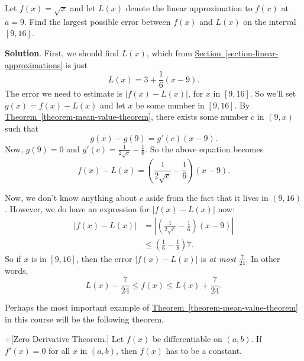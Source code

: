 \documentclass[10pt,]{book}
\theoremstyle{ptxplainnotitle}
\theoremstyle{ptxplaintitle}
\theoremstyle{ptxplainnotitle}
\theoremstyle{ptxplaintitle}
\theoremstyle{ptxplainnotitle}
\theoremstyle{ptxplaintitle}
\theoremstyle{ptxdefinitionnotitle}
\theoremstyle{ptxdefinitiontitle}
\theoremstyle{ptxdefinitionnotitle}
\theoremstyle{ptxdefinitiontitle}
\theoremstyle{ptxdefinitionnotitle}
\theoremstyle{ptxdefinitiontitle}
\theoremstyle{ptxdefinitionnotitle}
\theoremstyle{ptxdefinitiontitle}
\theoremstyle{ptxdefinitionnotitle}
\theoremstyle{ptxdefinitiontitle}
\numberwithin{equation}{section}
\begin{document}
\begin{example}\label{example-estimating-error-in-a-linear-approximation}
\hypertarget{p-340}{}%
Let \(f(x) = \sqrt{x}\) and let \(L(x)\) denote the linear approximation to \(f(x)\) at \(a=9\). Find the largest possible error between \(f(x)\) and \(L(x)\) on the interval \([9,16]\).%
\par\smallskip%
\noindent\textbf{Solution}.\hypertarget{solution-74}{}\quad%
\hypertarget{p-341}{}%
First, we should find \(L(x)\), which from \hyperref[section-linear-approximations]{Section~\ref{section-linear-approximations}} is just%
\begin{equation*}
L(x) = 3 + \frac{1}{6}(x-9).
\end{equation*}
The error we need to estimate is \(|f(x) - L(x)|\), for \(x\) in \([9,16]\). So we'll set \(g(x) = f(x) - L(x)\) and let \(x\) be some number in \([9,16]\). By \hyperref[theorem-mean-value-theorem]{Theorem~\ref{theorem-mean-value-theorem}}, there exists some number \(c\) in \((9,x)\) such that%
\begin{equation*}
g(x) - g(9) = g'(c)(x-9).
\end{equation*}
Now, \(g(9) = 0\) and \(g'(c) = \frac{1}{2\sqrt{c}} - \frac{1}{6}\). So the above equation becomes%
\begin{equation*}
f(x) - L(x) = \left(\frac{1}{2\sqrt{c}} - \frac{1}{6}\right)(x-9).
\end{equation*}
%
\par
\hypertarget{p-342}{}%
Now, we don't know anything about \(c\) aside from the fact that it lives in \((9,16)\). However, we do have an expression for \(|f(x) - L(x)|\) now:%
\begin{align*}
|f(x) - L(x)| & = \left|\left(\frac{1}{2\sqrt{c}} - \frac{1}{6}\right)(x-9)\right|\\
& \leq \left(\frac{1}{6} - \frac{1}{8}\right)7. 
\end{align*}
So if \(x\) is in \([9,16]\), then the error \(|f(x) - L(x)|\) is \emph{at most} \(\frac{7}{24}\). In other words,%
\begin{equation*}
L(x) - \frac{7}{24} \leq f(x) \leq L(x) + \frac{7}{24}.
\end{equation*}
%
\end{example}
\hypertarget{p-343}{}%
Perhaps the most important example of \hyperref[theorem-mean-value-theorem]{Theorem~\ref{theorem-mean-value-theorem}} in this course will be the following theorem.%
\begin{theorem}+[{Zero Derivative Theorem.}]\label{theorem-zero-derivative-theorem}
\hypertarget{p-344}{}%
Let \(f(x)\) be differentiable on \((a,b)\). If \(f'(x) = 0\) for all \(x\) in \((a,b)\), then \(f(x)\) has to be a constant.%
\end{theorem}
\end{document}
